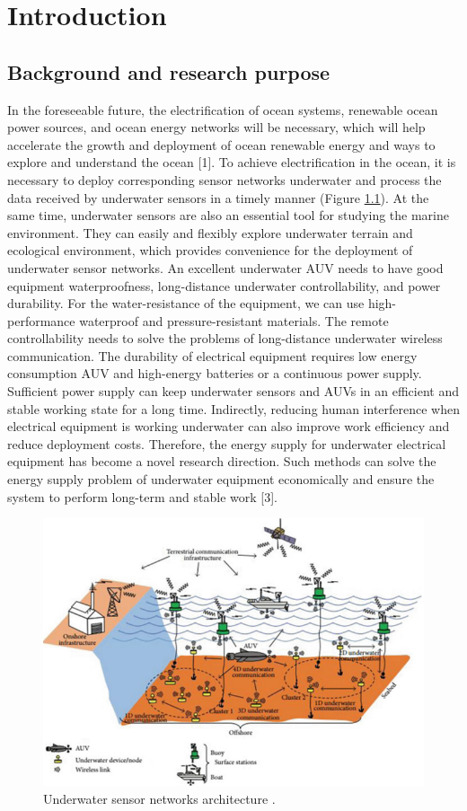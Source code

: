 \chapter{Introduction}
\section{Background and research purpose}
In the foreseeable future, the electrification of ocean systems, renewable ocean power sources, and ocean energy networks will be necessary, which will help accelerate the growth and deployment of ocean renewable energy and ways to explore and understand the ocean [1]. To achieve electrification in the ocean, it is necessary to deploy corresponding sensor networks underwater and process the data received by underwater sensors in a timely manner (Figure \ref{fig:underwater sensor networks}). At the same time, underwater sensors are also an essential tool for studying the marine environment. They can easily and flexibly explore underwater terrain and ecological environment, which provides convenience for the deployment of underwater sensor networks. An excellent underwater AUV needs to have good equipment waterproofness, long-distance underwater controllability, and power durability. For the water-resistance of the equipment, we can use high-performance waterproof and pressure-resistant materials. The remote controllability needs to solve the problems of long-distance underwater wireless communication. The durability of electrical equipment requires low energy consumption AUV and high-energy batteries or a continuous power supply. Sufficient power supply can keep underwater sensors and AUVs in an efficient and stable working state for a long time. Indirectly, reducing human interference when electrical equipment is working underwater can also improve work efficiency and reduce deployment costs. Therefore, the energy supply for underwater electrical equipment has become a novel research direction. Such methods can solve the energy supply problem of underwater equipment economically and ensure the system to perform long-term and stable work [3].

\begin{figure}[htbp]
    \centering
    \includegraphics[width=0.7\linewidth]{images/1_underwater_sensor_networks.png}
    \caption{Underwater sensor networks architecture \cite{Nayyar}.}
    \label{fig:underwater sensor networks}
\end{figure}

